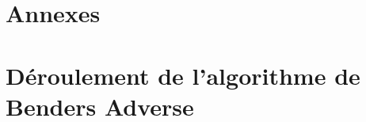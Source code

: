 \documentclass[12pt, a4paper, twoside]{report}
\numberwithin{equation}{section}
\begin{document}
\begin{Figure}[H]
	\printbibliography
	
	\clearpage
	\section*{Annexes}

    \appendix
    
    \begingroup
        
        \localtableofcontents
    \endgroup

    \clearpage
    \section{Déroulement de l'algorithme de Benders Adverse}

    \begingroup
        \let\section\subsection
        \let\subsection\subsubsection
        \let\subsubsection\paragraph
        
    \endgroup
    


\end{Figure}
\end{document}
